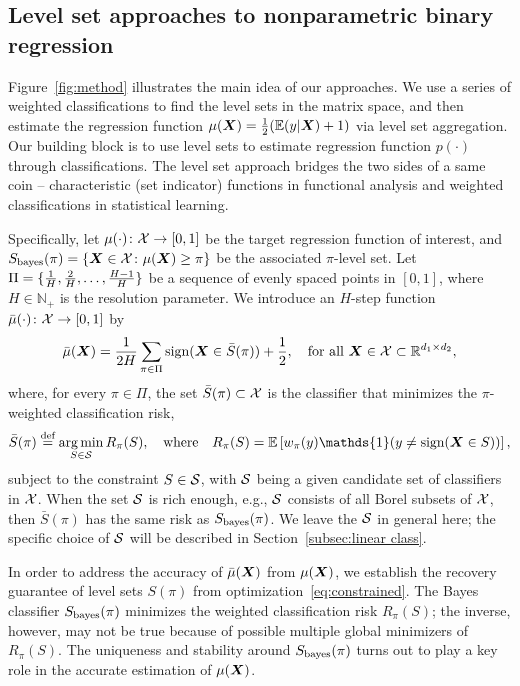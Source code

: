 \documentclass[11pt]{article}
\theoremstyle{plain}
\theoremstyle{definition}
\def\sign{\textup{sign}}
\def\bayesS{S_{\textup{bayes}}}
\begin{document}
\subsection{Level set approaches to nonparametric binary regression}\label{sec:bridge}
Figure~\ref{fig:method} illustrates the main idea of our approaches. We use a series of weighted classifications to find the level sets in the matrix space, and then estimate the regression function $\mu(\bm X)={1\over 2}(\mathbb{E}(y|\bm X)+1)$ via level set aggregation. Our building block is to use level sets to estimate regression function $p(\cdot)$ through classifications. The level set approach bridges the two sides of a same coin -- characteristic (set indicator) functions in functional analysis and weighted classifications in statistical learning. 

Specifically, let $\mu(\cdot)\colon \mathcal{X} \to [0,1]$ be the target regression function of interest, and $\bayesS(\pi)=\{\mX\in \tX\colon \mu(\mX)\geq \pi\}$ be the associated $\pi$-level set. Let $\Pi=\{{1\over H}, {2\over H}, \ldots, {H-1\over H} \}$ be a sequence of evenly spaced points in $[0,1]$, where $H\in\mathbb{N}_{+}$ is the resolution parameter. We introduce an $H$-step function $\bar \mu(\cdot)\colon \mathcal{X} \to [0,1]$ by
\begin{equation}\label{eq:stepfunction}
\bar \mu(\mX)= {1\over 2H}  \sum_{\pi \in \Pi} \sign (\mX\in \bar S(\pi))+{1\over 2}, \quad \text{for all }\mX\in\tX\subset \mathbb{R}^{d_1\times d_2},
\end{equation}
where, for every $\pi\in\Pi$, the set $\bar S(\pi)\subset \mathcal{X}$ is the classifier that minimizes the $\pi$-weighted classification risk,
\begin{equation}\label{eq:constrained}
\bar S(\pi) \stackrel{\text{def}}{=} \argmin_{S\in \tS}R_\pi(S), \quad \text{where}\quad R_\pi(S)=\mathbb{E}\left[ w_{\pi}(y)\mathds{1}(y\neq \sign (\mX\in S))\right],
\end{equation}
subject to the constraint $S\in\mathcal{S}$, with $\mathcal{S}$ being a given candidate set of classifiers in $\mathcal{X}$. When the set $\mathcal{S}$ is rich enough, e.g., $\mathcal{S}$ consists of all Borel subsets of $\mathcal{X}$, then $\bar S(\pi)$ has the same risk as $\bayesS(\pi)$. We leave the $\mathcal{S}$ in general here; the specific choice of $\mathcal{S}$ will be described in Section~\ref{subsec:linear class}. 

In order to address the accuracy of $\bar \mu(\bm X)$ from $\mu(\bm X)$, we establish the recovery guarantee of level sets $S(\pi)$ from optimization~\eqref{eq:constrained}. The Bayes classifier $\bayesS(\pi)$ minimizes the weighted classification risk $R_\pi(S)$; the inverse, however, may not be true because of possible multiple global minimizers of $R_\pi(S)$. The uniqueness and stability around $\bayesS(\pi)$ turns out to play a key role in the accurate estimation of $\mu(\bm X)$. 
\end{document}
